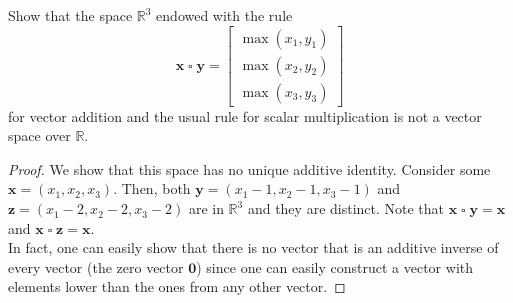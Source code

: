 \documentclass[12pt]{article}
\newcommand{\R}{\mathbb{R}}
\newenvironment{problem}[2][Problem]{\begin{trivlist} \item[\hskip \labelsep {\bfseries #1}\hskip \labelsep {\bfseries #2.}]}{\end{trivlist}}
\begin{document}
    \begin{problem}{1.2}
      Show that the space $\R^{3}$ endowed with the rule
    \begin{equation*}
      \mathbf{x}\; \square \; \mathbf{y} = \begin{bmatrix} \max(x_{1},y_{1}) \\ \max(x_{2},y_{2}) \\ \max(x_{3},y_{3}) \end{bmatrix}
    \end{equation*}
    for vector addition and the usual rule for scalar multiplication is not a vector space over $\R$. 
    \begin{proof}
      We show that this space has no unique additive identity. Consider some $\mathbf{x} = (x_{1},x_{2},x_{3})$. Then, both $\mathbf{y} = (x_{1}-1,x_{2}-1,x_{3}-1)$ and $\mathbf{z} = (x_{1}-2, x_{2}-2, x_{3}-2)$ are in $\R^{3}$ and they are distinct. Note that $\mathbf{x} \; \square \; \mathbf{y} = \mathbf{x}$ and $\mathbf{x} \; \square \; \mathbf{z} = \mathbf{x}$. \\

      In fact, one can easily show that there is no vector that is an additive inverse of every vector (the zero vector $\mathbf{0}$) since one can easily construct a vector with elements lower than the ones from any other vector.
    \end{proof}
    \end{problem}
\end{document}
